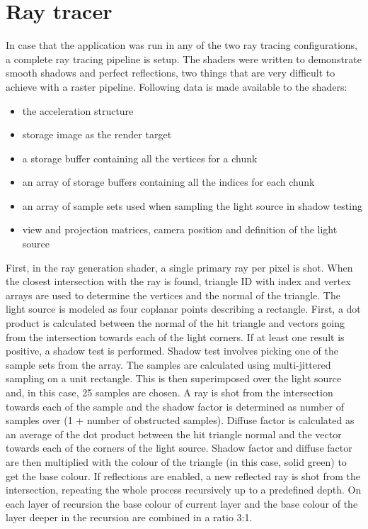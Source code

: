 \documentclass[times, utf8, zavrsni, numeric]{fer}
\begin{document}
\section{Ray tracer}
In case that the application was run in any of the two ray tracing configurations, a complete ray tracing pipeline is setup. The shaders were written to demonstrate smooth shadows and perfect reflections, two things that are very difficult to achieve with a raster pipeline. Following data is made available to the shaders:
\begin{itemize}
	\item{the acceleration structure}
	\item{storage image as the render target}
	\item{a storage buffer containing all the vertices for a chunk}
	\item{an array of storage buffers containing all the indices for each chunk}
	\item{an array of sample sets used when sampling the light source in shadow testing}
	\item{view and projection matrices, camera position and definition of the light source}
\end{itemize}

First, in the ray generation shader, a single primary ray per pixel is shot. When the closest intersection with the ray is found, triangle ID with index and vertex arrays are used to determine the vertices and the normal of the triangle. The light source is modeled as four coplanar points describing a rectangle. First, a dot product is calculated between the normal of the hit triangle and vectors going from the intersection towards each of the light corners. If at least one result is positive, a shadow test is performed.
Shadow test involves picking one of the sample sets from the array. The samples are calculated using multi-jittered sampling on a unit rectangle. This is then superimposed over the light source and, in this case, 25 samples are chosen. A ray is shot from the intersection towards each of the sample and the shadow factor is determined as number of samples over (1 + number of obstructed samples). Diffuse factor is calculated as an average of the dot product between the hit triangle normal and the vector towards each of the corners of the light source. Shadow factor and diffuse factor are then multiplied with the colour of the triangle (in this case, solid green) to get the base colour. If reflections are enabled, a new reflected ray is shot from the intersection, repeating the whole process recursively up to a predefined depth. On each layer of recursion the base colour of current layer and the base colour of the layer deeper in the recursion are combined in a ratio 3:1.
\end{document}

